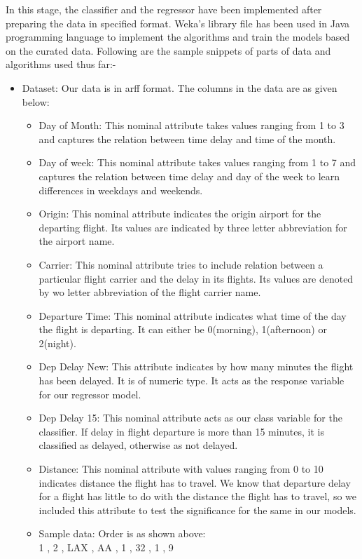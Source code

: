 In this stage, the classifier and the regressor have been implemented after preparing the data in specified format. Weka's library file has been used in Java programming language to implement the algorithms and train the models based on the curated data.
Following are the sample snippets of parts of data and algorithms used thus far:-
\begin{itemize} 
\item{Dataset: Our data is in arff format. The columns in the data are as given below:}

\begin{itemize}
\item{Day of Month:}
This nominal attribute takes values ranging from 1 to 3 and captures the relation between time delay and time of the month.
\item{Day of week:}
This nominal attribute takes values ranging from 1 to 7 and captures the relation between time delay and day of the week to learn differences in weekdays and weekends.
\item{Origin:}
This nominal attribute indicates the origin airport for the departing flight. Its values are indicated by three letter abbreviation for the airport name.
\item{Carrier:}
This nominal attribute tries to include relation between a particular flight carrier and the delay in its flights. Its values are denoted by wo letter abbreviation of the flight carrier name.
\item{Departure Time:}
This nominal attribute indicates what time of the day the flight is departing. It can either be 0(morning), 1(afternoon) or 2(night).
\item{Dep Delay New:}
This attribute indicates by how many minutes the flight has been delayed. It is of numeric type. It acts as the response variable for our regressor model.
\item{Dep Delay 15:}
This nominal attribute acts as our class variable for the classifier. If delay in flight departure is more than 15 minutes, it is classified as delayed, otherwise as not delayed.
\item{Distance:}
This nominal attribute with values ranging from 0 to 10 indicates distance the flight has to travel. We know that departure delay for a flight has little to do with the distance the flight has to travel, so we included this attribute to test the significance for the same in our models.
\item{Sample data: Order is as shown above:}
\\1 , 2 , LAX , AA , 1 , 32 , 1 , 9\\

\end{itemize}
\end{itemize}
